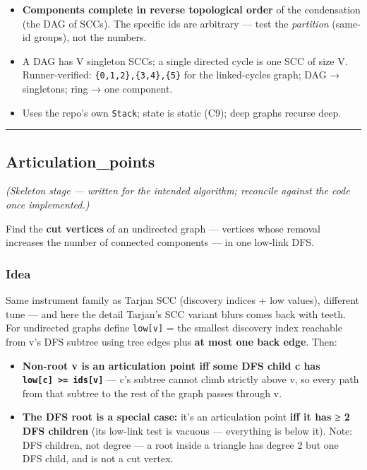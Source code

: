 \documentclass[
  10pt,
  letterpaper,
  onecolumn]{article}
\providecommand{\tightlist}{%
  \setlength{\itemsep}{0pt}\setlength{\parskip}{0pt}}
\begin{document}
\begin{itemize}
\tightlist
\item
  \textbf{Components complete in reverse topological order} of the
  condensation (the DAG of SCCs). The specific ids are arbitrary ---
  test the \emph{partition} (same-id groups), not the numbers.
\item
  A DAG has V singleton SCCs; a single directed cycle is one SCC of size
  V. Runner-verified: \texttt{\{0,1,2\},\{3,4\},\{5\}} for the
  linked-cycles graph; DAG → singletons; ring → one component.
\item
  Uses the repo's own \texttt{Stack}; state is static (C9); deep graphs
  recurse deep.
\end{itemize}

\begin{center}\rule{0.5\linewidth}{0.5pt}\end{center}

\hypertarget{articulation_points}{%
\subsection{Articulation\_points}\label{articulation_points}}

\emph{(Skeleton stage --- written for the intended algorithm; reconcile
against the code once implemented.)}

Find the \textbf{cut vertices} of an undirected graph --- vertices whose
removal increases the number of connected components --- in one low-link
DFS.

\hypertarget{idea-21}{%
\subsubsection{Idea}\label{idea-21}}

Same instrument family as Tarjan SCC (discovery indices + low values),
different tune --- and here the detail Tarjan's SCC variant blurs comes
back with teeth. For undirected graphs define \texttt{low{[}v{]}} = the
smallest discovery index reachable from v's DFS subtree using tree edges
plus \textbf{at most one back edge}. Then:

\begin{itemize}
\tightlist
\item
  \textbf{Non-root v is an articulation point iff some DFS child c has
  \texttt{low{[}c{]}\ \textgreater{}=\ ids{[}v{]}}} --- c's subtree
  cannot climb strictly above v, so every path from that subtree to the
  rest of the graph passes through v.
\item
  \textbf{The DFS root is a special case:} it's an articulation point
  \textbf{iff it has ≥ 2 DFS children} (its low-link test is vacuous ---
  everything is below it). Note: DFS children, not degree --- a root
  inside a triangle has degree 2 but one DFS child, and is not a cut
  vertex.
\end{itemize}
\end{document}
